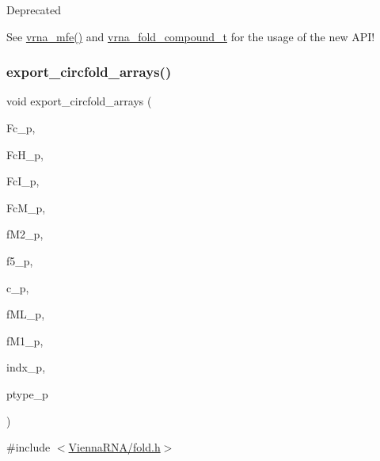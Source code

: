 \begin{DoxyRefDesc}{Deprecated}
\item[\mbox{\hyperlink{deprecated__deprecated000077}{Deprecated}}]See \mbox{\hyperlink{group__mfe__fold_gabd3b147371ccf25c577f88bbbaf159fd}{vrna\+\_\+mfe()}} and \mbox{\hyperlink{group__fold__compound_ga1b0cef17fd40466cef5968eaeeff6166}{vrna\+\_\+fold\+\_\+compound\+\_\+t}} for the usage of the new A\+P\+I!\end{DoxyRefDesc}
\mbox{\label{group__mfe__fold__single_ga04d5d639fd4473ca766436a9bae5665c}} 
\subsubsection{\texorpdfstring{export\+\_\+circfold\+\_\+arrays()}{export\_circfold\_arrays()}}
{\footnotesize\ttfamily void export\+\_\+circfold\+\_\+arrays (\begin{DoxyParamCaption}\item[{int $\ast$}]{Fc\+\_\+p,  }\item[{int $\ast$}]{Fc\+H\+\_\+p,  }\item[{int $\ast$}]{Fc\+I\+\_\+p,  }\item[{int $\ast$}]{Fc\+M\+\_\+p,  }\item[{int $\ast$$\ast$}]{f\+M2\+\_\+p,  }\item[{int $\ast$$\ast$}]{f5\+\_\+p,  }\item[{int $\ast$$\ast$}]{c\+\_\+p,  }\item[{int $\ast$$\ast$}]{f\+M\+L\+\_\+p,  }\item[{int $\ast$$\ast$}]{f\+M1\+\_\+p,  }\item[{int $\ast$$\ast$}]{indx\+\_\+p,  }\item[{char $\ast$$\ast$}]{ptype\+\_\+p }\end{DoxyParamCaption})}



{\ttfamily \#include $<$\mbox{\hyperlink{fold_8h}{Vienna\+R\+N\+A/fold.\+h}}$>$}

